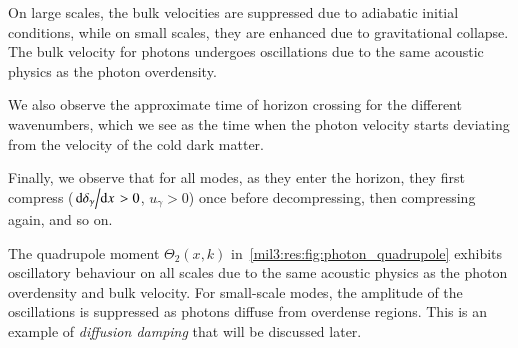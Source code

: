 On large scales, the bulk velocities are suppressed due to adiabatic initial conditions, while on small scales, they are enhanced due to gravitational collapse. The bulk velocity for photons undergoes oscillations due to the same acoustic physics as the photon overdensity.

We also observe the approximate time of horizon crossing for the different wavenumbers, which we see as the time when the photon velocity starts deviating from the velocity of the cold dark matter.

Finally, we observe that for all modes, as they enter the horizon, they first compress ($\dv*{\delta_\gamma}{x}> 0$, $u_\gamma> 0$) once before decompressing, then compressing again, and so on. 






The quadrupole moment $\Theta_2(x,k)$ in~\cref{mil3:res:fig:photon_quadrupole} exhibits oscillatory behaviour on all scales due to the same acoustic physics as the photon overdensity and bulk velocity. For small-scale modes, the amplitude of the oscillations is suppressed as photons diffuse from overdense regions. This is an example of \textit{diffusion damping} that will be discussed later. 


